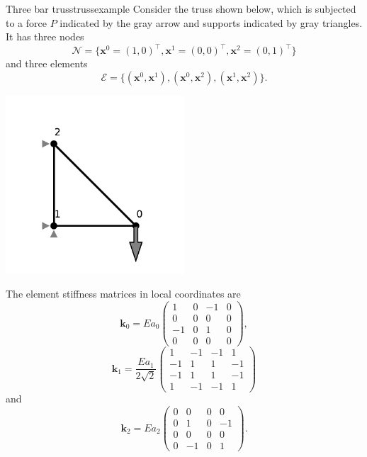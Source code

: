 \begin{example}{Three bar truss}{trussexample}
    Consider the truss shown below, which is subjected to a force $P$ indicated by the gray arrow and supports indicated by gray triangles. It has three nodes 
    \begin{equation}
        \mathcal{N} = \{\mathbf{x}^0=(1,0)^\top, \mathbf{x}^1=(0,0)^\top,\mathbf{x}^2=(0,1)^\top \}
    \end{equation}
    and three elements 
    \begin{equation}
        \mathcal{E} = \{(\mathbf{x}^0, \mathbf{x}^1), (\mathbf{x}^0, \mathbf{x}^2), (\mathbf{x}^1, \mathbf{x}^2)\}.
    \end{equation}

    \begin{center}
        \includegraphics[width=0.5\textwidth]{figures/three_bar_truss.pdf}
    \end{center}

    The element stiffness matrices in local coordinates are 
    \begin{equation}
        \mathbf{k}_0 = E a_0
        \begin{pmatrix}
             1 & 0 & -1 & 0 \\
             0 & 0 &  0 & 0 \\
            -1 & 0 &  1 & 0 \\
             0 & 0 &  0 & 0
        \end{pmatrix},
    \end{equation}
    \begin{equation}
        \mathbf{k}_1 = \frac{E a_1}{2\sqrt{2}}
        \begin{pmatrix}
             1 & -1 & -1 &  1 \\
            -1 &  1 &  1 & -1 \\
            -1 &  1 &  1 & -1 \\
             1 & -1 & -1 &  1
        \end{pmatrix}
    \end{equation}
    and 
    \begin{equation}
        \mathbf{k}_2 = E a_2
        \begin{pmatrix}
            0 &  0 & 0 &  0 \\
            0 &  1 & 0 & -1 \\
            0 &  0 & 0 &  0 \\
            0 & -1 & 0 &  1 
        \end{pmatrix}.
    \end{equation}


\end{example}
